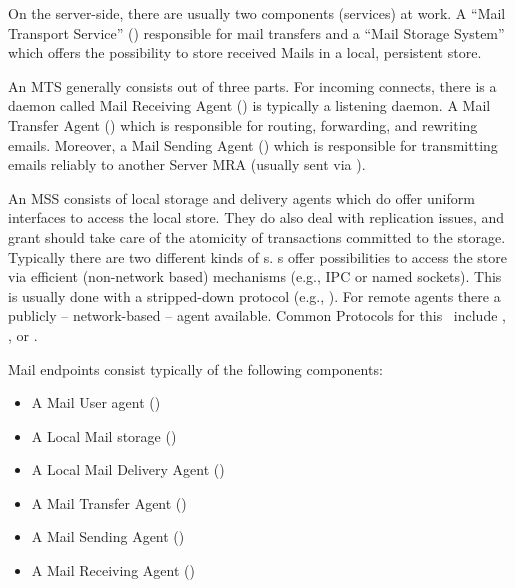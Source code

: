 On the server-side, there are usually two components (services) at work. A ``Mail Transport Service'' () responsible for mail transfers and a ``Mail Storage System'' which offers the possibility to store received Mails in a local, persistent store.\par

An MTS generally consists out of three parts. For incoming connects, there is a daemon called Mail Receiving Agent () is typically a  listening daemon. A Mail Transfer Agent () which is responsible for routing, forwarding, and rewriting emails. Moreover, a Mail Sending Agent () which is responsible for transmitting emails reliably to another Server MRA (usually sent via ).\par

An MSS consists of local storage and delivery agents which do offer uniform interfaces to access the local store. They do also deal with replication issues, and grant should take care of the atomicity of transactions committed to the storage. Typically there are two different kinds of s. s offer possibilities to access the store via efficient (non-network based) mechanisms (e.g., IPC or named sockets). This is usually done with a stripped-down protocol (e.g., ). For remote agents there a publicly -- network-based -- agent available. Common Protocols for this \ include , , or .\par

Mail endpoints consist typically of the following components:
\begin{itemize}
	\item A Mail User agent ()
	\item A Local Mail storage ()
	\item A Local Mail Delivery Agent ()
	\item A Mail Transfer Agent ()
	\item A Mail Sending Agent ()
	\item A Mail Receiving Agent ()
\end{itemize}

